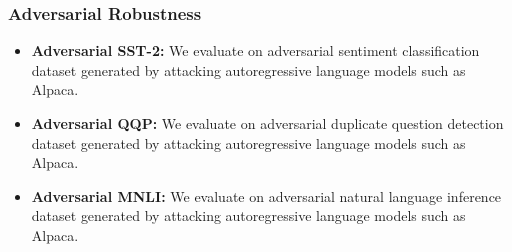 \subsubsection*{Adversarial Robustness}
        \begin{itemize}
        \item \textbf{Adversarial SST-2:} We evaluate on adversarial sentiment classification dataset \cite{socher-etal-2013-recursive} generated by attacking autoregressive language models such as Alpaca.
        \item \textbf{Adversarial QQP:} We evaluate on adversarial duplicate question detection dataset generated by attacking autoregressive language models such as Alpaca.
        \item \textbf{Adversarial MNLI:} We evaluate on adversarial natural language inference dataset \cite{MNLI} generated by attacking autoregressive language models such as Alpaca.
    \end{itemize}